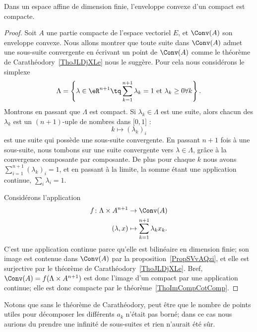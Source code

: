 \begin{corollary}   \label{CorOFrXzIf}
	Dans un espace affine de dimension finie, l'enveloppe convexe d'un compact est compacte.
\end{corollary}

\begin{proof}
	Soit \( A\) une partie compacte de l'espace vectoriel \( E\), et \( \Conv(A)\) son enveloppe convexe. Nous allons montrer que toute suite dans \( \Conv(A)\) admet une sous-suite convergente en écrivant un point de \( \Conv(A)\) comme le théorème de Carathéodory~\ref{ThoJLDjXLe} nous le suggère. Pour cela nous considérons le simplexe
	\begin{equation}
		\Lambda=\left\{  \lambda\in \eR^{n+1}\tq \sum_{k=1}^{n+1}\lambda_k=1\text{ et } \lambda_k\geq 0\forall k   \right\}.
	\end{equation}
	Montrons en passant que \( \Lambda\) est compact. Si \( \lambda_k\in \Lambda\) est une suite, alors chacun des \( \lambda_k\) est un \( (n+1)\)-uple de nombres dans \( \mathopen[ 0 , 1 \mathclose]\) :
	\begin{equation}
		k\mapsto (\lambda_k)_i
	\end{equation}
	est une suite qui possède une sous-suite convergente. En passant \( n+1\) fois à une sous-suite, nous tombons sur une suite convergente vers \( \lambda\in\Lambda\), grâce à la convergence composante par composante. De plus pour chaque \( k\) nous avons \( \sum_{i=1}^{n+1}(\lambda_k)_i=1\), et en passant à la limite, la somme étant une application continue, \( \sum_{i}\lambda_i=1\).

	Considérons l'application
	\begin{equation}
		\begin{aligned}
			f\colon \Lambda\times A^{n+1} & \to \Conv(A)                          \\
			(\lambda,x)                   & \mapsto \sum_{k=1}^{n+1}\lambda_kx_k.
		\end{aligned}
	\end{equation}
	C'est une application continue parce qu'elle est bilinéaire en dimension finie; son image est contenue dans \( \Conv(A)\) par la proposition~\ref{PropSVvAQzi}, et elle est surjective par le théorème de Carathéodory~\ref{ThoJLDjXLe}. Bref, \( \Conv(A)=f(\Lambda\times A^{n+1})\) est donc l'image d'un compact par une application continue; elle est donc compacte par le théorème~\ref{ThoImCompCotComp}.
\end{proof}
Notons que sans le théorème de Carathéodory, peut être que le nombre de points utiles pour décomposer les différents \( a_k\) n'était pas borné; dans ce cas nous aurions du prendre une infinité de sous-suites et rien n'aurait été sûr.

